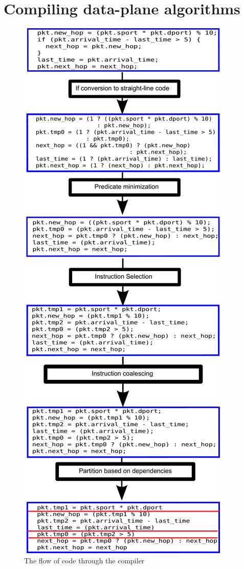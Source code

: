 \section{Compiling data-plane algorithms}
\label{s:compiler}

\begin{figure}
\includegraphics[width=\columnwidth]{compiler_flow.pdf}
\caption{The flow of code through the compiler}
\label{fig:flow}
\end{figure}

